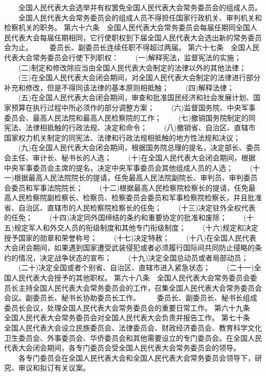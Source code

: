 　　全国人民代表大会选举并有权罢免全国人民代表大会常务委员会的组成人员。
　　全国人民代表大会常务委员会的组成人员不得担任国家行政机关、审判机关和检察机关的职务。
     第六十六条　全国人民代表大会常务委员会每届任期同全国人民代表大会每届任期相同，它行使职权到下届全国人民代表大会选出新的常务委员会为止。
　　委员长、副委员长连续任职不得超过两届。
     第六十七条　全国人民代表大会常务委员会行使下列职权：
　　(一)解释宪法，监督宪法的实施；
　　(二)制定和修改除应当由全国人民代表大会制定的法律以外的其他法律；
　　(三)在全国人民代表大会闭会期间，对全国人民代表大会制定的法律进行部分补充和修改，但是不得同该法律的基本原则相抵触；
　　(四)解释法律；
　　(五)在全国人民代表大会闭会期间，审查和批准国民经济和社会发展计划、国家预算在执行过程中所必须作的部分调整方案；
　　(六)监督国务院、中央军事委员会、最高人民法院和最高人民检察院的工作；
　　(七)撤销国务院制定的同宪法、法律相抵触的行政法规、决定和命令；
　　(八)撤销省、自治区、直辖市国家权力机关制定的同宪法、法律和行政法规相抵触的地方性法规和决议；
　　(九)在全国人民代表大会闭会期间，根据国务院总理的提名，决定部长、委员会主任、审计长、秘书长的人选；
　　(十)在全国人民代表大会闭会期间，根据中央军事委员会主席的提名，决定中央军事委员会其他组成人员的人选；
　　(十一)根据最高人民法院院长的提请，任免最高人民法院副院长、审判员、审判委员会委员和军事法院院长；
　　(十二)根据最高人民检察院检察长的提请，任免最高人民检察院副检察长、检察员、检察委员会委员和军事检察院检察长，并且批准省、自治区、直辖市的人民检察院检察长的任免；
　　(十三)决定驻外全权代表的任免；
　　(十四)决定同外国缔结的条约和重要协定的批准和废除；
　　(十五)规定军人和外交人员的衔级制度和其他专门衔级制度；
　　(十六)规定和决定授予国家的勋章和荣誉称号；
　　(十七)决定特赦；
　　(十八)在全国人民代表大会闭会期间，如果遇到国家遭受武装侵犯或者必须履行国际间共同防止侵略的条约的情况，决定战争状态的宣布；
　　(十九)决定全国总动员或者局部动员；
　　(二十)决定全国或者个别省、自治区、直辖市进入紧急状态；
　　(二十一)全国人民代表大会授予的其他职权。
     第六十八条　全国人民代表大会常务委员会委员长主持全国人民代表大会常务委员会的工作，召集全国人民代表大会常务委员会会议。副委员长、秘书长协助委员长工作。
　　委员长、副委员长、秘书长组成委员长会议，处理全国人民代表大会常务委员会的重要日常工作。
     第六十九条　全国人民代表大会常务委员会对全国人民代表大会负责并报告工作。
     第七十条　全国人民代表大会设立民族委员会、法律委员会、财政经济委员会、教育科学文化卫生委员会、外事委员会、华侨委员会和其他需要设立的专门委员会。在全国人民代表大会闭会期间，各专门委员会受全国人民代表大会常务委员会的领导。
　　各专门委员会在全国人民代表大会和全国人民代表大会常务委员会领导下，研究、审议和拟订有关议案。
